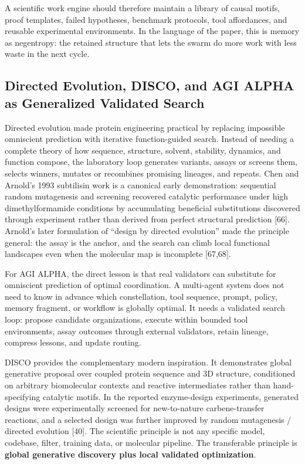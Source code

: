\documentclass[11pt]{article}
\begin{document}
A scientific work engine should therefore maintain a library of causal
motifs, proof templates, failed hypotheses, benchmark protocols, tool
affordances, and reusable experimental environments. In the language of
the paper, this is memory as negentropy: the retained structure that
lets the swarm do more work with less waste in the next cycle.

\subsection{Directed Evolution, DISCO, and AGI ALPHA as Generalized
Validated
Search}\label{directed-evolution-disco-and-agi-alpha-as-generalized-validated-search}

Directed evolution made protein engineering practical by replacing
impossible omniscient prediction with iterative function-guided search.
Instead of needing a complete theory of how sequence, structure,
solvent, stability, dynamics, and function compose, the laboratory loop
generates variants, assays or screens them, selects winners, mutates or
recombines promising lineages, and repeats. Chen and Arnold's 1993
subtilisin work is a canonical early demonstration: sequential random
mutagenesis and screening recovered catalytic performance under high
dimethylformamide conditions by accumulating beneficial substitutions
discovered through experiment rather than derived from perfect
structural prediction {[}66{]}. Arnold's later formulation of ``design
by directed evolution'' made the principle general: the assay is the
anchor, and the search can climb local functional landscapes even when
the molecular map is incomplete {[}67,68{]}.

For AGI ALPHA, the direct lesson is that real validators can substitute
for omniscient prediction of optimal coordination. A multi-agent system
does not need to know in advance which constellation, tool sequence,
prompt, policy, memory fragment, or workflow is globally optimal. It
needs a validated search loop: propose candidate organizations, execute
within bounded tool environments, assay outcomes through external
validators, retain lineage, compress lessons, and update routing.

DISCO provides the complementary modern inspiration. It demonstrates
global generative proposal over coupled protein sequence and 3D
structure, conditioned on arbitrary biomolecular contexts and reactive
intermediates rather than hand-specifying catalytic motifs. In the
reported enzyme-design experiments, generated designs were
experimentally screened for new-to-nature carbene-transfer reactions,
and a selected design was further improved by random mutagenesis /
directed evolution {[}40{]}. The scientific principle is not any
specific model, codebase, filter, training data, or molecular pipeline.
The transferable principle is \textbf{global generative discovery plus
local validated optimization}.
\end{document}
